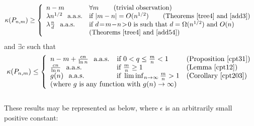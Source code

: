 \documentclass{article}
\newtheorem{Proof of Theorem}{Proof of Theorem}
\begin{document}
\begin{displaymath}
\kappa(P_{n,m}) \geq
\left\{ \begin{array}{ll}
n-m & \forall m \phantom{www} \textrm{(trivial observation)} \\
\lambda n^{1/2} \phantom{w} \textrm{a.a.s.} &
\textrm{if $|m-n|=O(n^{1/2})$ \phantom{ww} (Theorems~\ref{tree4} and~\ref{add3}) }\\
\lambda \frac{n}{d} \phantom{w} \textrm{a.a.s.} &
\textrm{if $d\!=\!m\!-\!n\!>\!0$ is such that $d=\Omega(n^{1/2})$ and $O(n)$ } \\
& \textrm{(Theorems~\ref{tree4} and~\ref{add54}) }
\end{array} \right. 
\end{displaymath} 
and $\exists c$ such that
\begin{displaymath}
\kappa(P_{n,m}) \leq
\left\{ \begin{array}{ll}
n-m + \frac{cn}{\ln n} \phantom{w} \textrm{a.a.s.} 
\phantom{w} \textrm{ if } 0<q \leq \frac{m}{n} <1 &
\textrm{(Proposition~\ref{cpt31})} \\
\frac{cn}{\ln n} \phantom{w} \textrm{a.a.s.} 
\phantom{wwwqqqqqi} \textrm{if } \frac{m}{n} \geq 1 &
\textrm{(Lemma~\ref{cpt12})} \\
g(n) \phantom{w} \textrm{a.a.s.} 
\phantom{wwwwqqii} \textrm{if } \liminf_{n \to \infty} \frac{m}{n} > 1 &
\textrm{(Corollary~\ref{cpt203})} \\
(\textrm{where $g$ is any function with $g(n) \to \infty$}) 
\end{array} \right. 
\end{displaymath} \\





These results may be represented as below,
where $\epsilon$ is an arbitrarily small positive constant: \\
\end{document}
